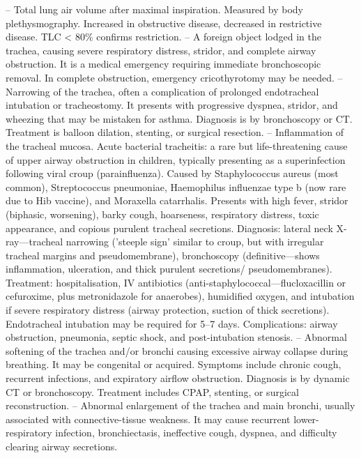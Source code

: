 -- Total lung air volume after maximal inspiration. Measured by body plethysmography. Increased in obstructive disease, decreased in restrictive disease. TLC < 80\% confirms restriction.
-- A foreign object lodged in the trachea, causing severe respiratory distress, stridor, and complete airway obstruction. It is a medical emergency requiring immediate bronchoscopic removal. In complete obstruction, emergency cricothyrotomy may be needed.
-- Narrowing of the trachea, often a complication of prolonged endotracheal intubation or tracheostomy. It presents with progressive dyspnea, stridor, and wheezing that may be mistaken for asthma. Diagnosis is by bronchoscopy or CT. Treatment is balloon dilation, stenting, or surgical resection.
-- Inflammation of the tracheal mucosa. Acute bacterial tracheitis: a rare but life-threatening cause of upper airway obstruction in children, typically presenting as a superinfection following viral croup (parainfluenza). Caused by Staphylococcus aureus (most common), Streptococcus pneumoniae, Haemophilus influenzae type b (now rare due to Hib vaccine), and Moraxella catarrhalis. Presents with high fever, stridor (biphasic, worsening), barky cough, hoarseness, respiratory distress, toxic appearance, and copious purulent tracheal secretions. Diagnosis: lateral neck X-ray—tracheal narrowing ('steeple sign' similar to croup, but with irregular tracheal margins and pseudomembrane), bronchoscopy (definitive—shows inflammation, ulceration, and thick purulent secretions/ pseudomembranes). Treatment: hospitalisation, IV antibiotics (anti-staphylococcal—flucloxacillin or cefuroxime, plus metronidazole for anaerobes), humidified oxygen, and intubation if severe respiratory distress (airway protection, suction of thick secretions). Endotracheal intubation may be required for 5--7 days. Complications: airway obstruction, pneumonia, septic shock, and post-intubation stenosis.
-- Abnormal softening of the trachea and/or bronchi causing excessive airway collapse during breathing. It may be congenital or acquired. Symptoms include chronic cough, recurrent infections, and expiratory airflow obstruction. Diagnosis is by dynamic CT or bronchoscopy. Treatment includes CPAP, stenting, or surgical reconstruction.
-- Abnormal enlargement of the trachea and main bronchi, usually associated with connective-tissue weakness. It may cause recurrent lower-respiratory infection, bronchiectasis, ineffective cough, dyspnea, and difficulty clearing airway secretions.
